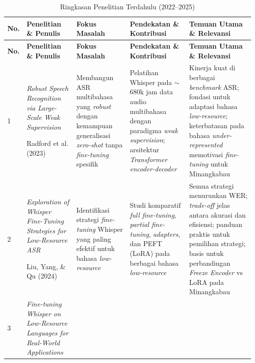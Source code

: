 {\small
\setlength{\tabcolsep}{4pt}
{\renewcommand\tabularxcolumn[1]{>{\RaggedRight\arraybackslash}p{#1}}
\begin{xltabular}{\textwidth}{|>{\centering\arraybackslash}p{0.05\textwidth}|X|X|X|X|}
\caption{Ringkasan Penelitian Terdahulu (2022--2025)}
\label{table:2.literasi}\\
\hline
\textbf{No.} & 
\textbf{Penelitian \& Penulis} & 
\textbf{Fokus Masalah} & 
\textbf{Pendekatan \& Kontribusi} & 
\textbf{Temuan Utama \& Relevansi}\\
\hline
\endfirsthead

\hline
\textbf{No.} & 
\textbf{Penelitian \& Penulis} & 
\textbf{Fokus Masalah} & 
\textbf{Pendekatan \& Kontribusi} & 
\textbf{Temuan Utama \& Relevansi}\\
\hline
\endhead

1 & 
\textit{Robust Speech Recognition via Large-Scale Weak Supervision} 

Radford et al. \cite{radford2023whisper} (2023) & 

Membangun ASR multibahasa yang \textit{robust} dengan kemampuan generalisasi \textit{zero-shot} tanpa \textit{fine-tuning} spesifik & 

Pelatihan Whisper pada $\sim$680k jam data audio multibahasa dengan paradigma \textit{weak supervision}; arsitektur \textit{Transformer encoder-decoder} & 

Kinerja kuat di berbagai \textit{benchmark} ASR; fondasi untuk adaptasi bahasa \textit{low-resource}; keterbatasan pada bahasa \textit{under-represented} memotivasi \textit{fine-tuning} untuk Minangkabau \\
\hline

2 & 
\textit{Exploration of Whisper Fine-Tuning Strategies for Low-Resource ASR}

Liu, Yang, \& Qu \cite{liu2024exploration} (2024) & 

Identifikasi strategi \textit{fine-tuning} Whisper yang paling efektif untuk bahasa \textit{low-resource} & 

Studi komparatif \textit{full fine-tuning}, \textit{partial fine-tuning}, \textit{adapters}, dan PEFT (LoRA) pada berbagai bahasa \textit{low-resource} & 

Semua strategi menurunkan WER; \textit{trade-off} jelas antara akurasi dan efisiensi; panduan praktis untuk pemilihan strategi; basis untuk perbandingan \textit{Freeze Encoder} vs LoRA pada Minangkabau \\
\hline

3 & 
\textit{Fine-tuning Whisper on Low-Resource Languages for Real-World Applications}


\end{xltabular}}}

